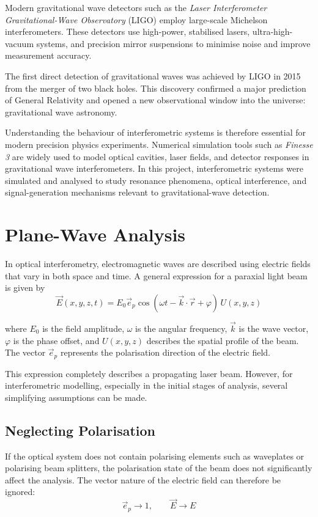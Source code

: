 \documentclass{report}
\begin{document}
Modern gravitational wave detectors such as the \textit{Laser Interferometer Gravitational-Wave Observatory} (LIGO) employ large-scale Michelson interferometers. These detectors use high-power, stabilised lasers, ultra-high-vacuum systems, and precision mirror suspensions to minimise noise and improve measurement accuracy.

The first direct detection of gravitational waves was achieved by LIGO in 2015 from the merger of two black holes. This discovery confirmed a major prediction of General Relativity and opened a new observational window into the universe: gravitational wave astronomy.

Understanding the behaviour of interferometric systems is therefore essential for modern precision physics experiments. Numerical simulation tools such as \textit{Finesse 3} are widely used to model optical cavities, laser fields, and detector responses in gravitational wave interferometers. In this project, interferometric systems were simulated and analysed to study resonance phenomena, optical interference, and signal-generation mechanisms relevant to gravitational-wave detection.

\section{Plane-Wave Analysis}
In optical interferometry, electromagnetic waves are described using electric fields that vary in both space and time. A general expression for a paraxial light beam is given by
\begin{equation}
\vec{E}(x,y,z,t)=E_0 \vec{e}_p \cos(\omega t-\vec{k}\cdot\vec{r}+\varphi)\,U(x,y,z)
\end{equation}

where $E_0$ is the field amplitude, $\omega$ is the angular frequency, $\vec{k}$ is the wave vector, $\varphi$ is the phase offset, and $U(x,y,z)$ describes the spatial profile of the beam. The vector $\vec{e}_p$ represents the polarisation direction of the electric field.

This expression completely describes a propagating laser beam. However, for interferometric modelling, especially in the initial stages of analysis, several simplifying assumptions can be made.

\subsection{Neglecting Polarisation}

If the optical system does not contain polarising elements such as waveplates or polarising beam splitters, the polarisation state of the beam does not significantly affect the analysis. The vector nature of the electric field can therefore be ignored:
\begin{equation}
\vec{e}_p \rightarrow 1,
\qquad
\vec{E} \rightarrow E
\end{equation}
\end{document}
